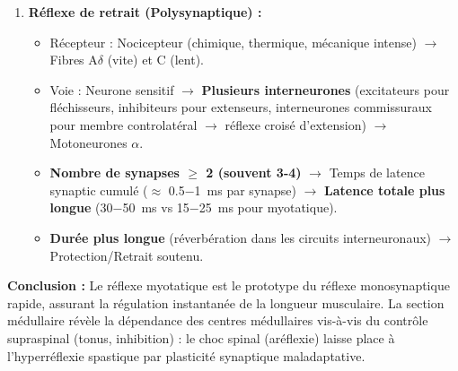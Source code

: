 \documentclass[11pt]{article}
\begin{document}
\begin{exoresolu}
\begin{enumerate}
\begin{center}
\begin{tabularx}{\linewidth}{|l|X|X|}
    \end{tabularx}
    \end{center}
    \item \textbf{Réflexe de retrait (Polysynaptique) :}
    \begin{itemize}
        \item Récepteur : Nocicepteur (chimique, thermique, mécanique intense) $\rightarrow$ Fibres A$\delta$ (vite) et C (lent).
        \item Voie : Neurone sensitif $\rightarrow$ \textbf{Plusieurs interneurones} (excitateurs pour fléchisseurs, inhibiteurs pour extenseurs, interneurones commissuraux pour membre controlatéral $\rightarrow$ réflexe croisé d'extension) $\rightarrow$ Motoneurones $\alpha$.
        \item \textbf{Nombre de synapses $\ge$ 2 (souvent 3-4)} $\rightarrow$ Temps de latence synaptic cumulé ($\approx$ \SI{0,5-1}{ms} par synapse) $\rightarrow$ \textbf{Latence totale plus longue} (\SI{30-50}{ms} vs \SI{15-25}{ms} pour myotatique).
        \item \textbf{Durée plus longue} (réverbération dans les circuits interneuronaux) $\rightarrow$ Protection/Retrait soutenu.
    \end{itemize}
\end{enumerate}
\textbf{Conclusion :} Le réflexe myotatique est le prototype du réflexe monosynaptique rapide, assurant la régulation instantanée de la longueur musculaire. La section médullaire révèle la dépendance des centres médullaires vis-à-vis du contrôle supraspinal (tonus, inhibition) : le choc spinal (aréflexie) laisse place à l'hyperréflexie spastique par plasticité synaptique maladaptative.
\end{exoresolu}
\end{document}
